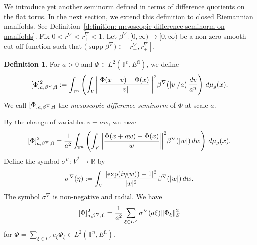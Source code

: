 \documentclass[a4paper,oneside,12pt]{amsart}
\theoremstyle{plain}
\theoremstyle{definition}
\newtheorem{definition}[theorem]{Definition}
\theoremstyle{remark}
\newcommand{\R}{\mathbb{R}}
\DeclarePairedDelimiter{\abs}{\lvert}{\rvert}
\DeclarePairedDelimiter{\norm}{\lVert}{\rVert}
\DeclarePairedDelimiter{\seminorm}{\lbrack}{\rbrack}
\DeclareMathOperator{\support}{supp}
\newcommand{\dvol}{d\mu}
\newcommand{\flattorus}{\mathbb{T}^n}
\newcommand{\Lattice}{L}
\newcommand{\duallattice}[1]{#1^{\vee}}
\newcommand{\flatmesoscopicdifferenceseminorm}[3][a]{\seminorm{#3}_{#1,#2,\mathrm{fl}}}
\newcommand{\cutoff}{\beta}
\newcommand{\cutoffnabla}{\cutoff^{\nabla}}
\newcommand{\symbolnabla}{\sigma^{\nabla}}
\newcommand{\flatmodel}[1]{#1^{\mathrm{fl}}}
\begin{document}
We introduce yet another seminorm defined in terms of difference quotients on the flat torus.
In the next section, we extend this definition to closed Riemannian manifolds.
See Definition~\ref{definition: mesoscopic difference seminorm on manifolds}.
Fix $0 < r_-^{\nabla} < r_+^{\nabla} < 1$.
Let $\cutoffnabla \colon [0,\infty) \to [0,\infty)$ be a non-zero smooth cut-off function such that $\big(\support \cutoffnabla\big) \subset [r_-^{\nabla},r_+^{\nabla}]$.
\begin{definition}\label{definition: flat mesoscopic difference seminorm}
  For $a > 0$ and $\Phi \in L^2(\flattorus,\flatmodel{E})$, we define
  \begin{equation}
    \flatmesoscopicdifferenceseminorm{\cutoffnabla}{\Phi}^2 := \int_{\flattorus} \left( \int_V \norm*{\frac{\Phi(x+v)-\Phi(x)}{\abs{v}}}^2 \cutoffnabla\big(\abs{v}/a\big) \,\frac{dv}{a^n} \right) \,\dvol_g(x).
  \end{equation}
  We call $\flatmesoscopicdifferenceseminorm{\cutoffnabla}{\Phi}$ the \emph{mesoscopic difference seminorm} of $\Phi$ at scale $a$.
\end{definition}

By the change of variables $v=aw$, we have
\begin{equation}
  \flatmesoscopicdifferenceseminorm{\cutoffnabla}{\Phi}^2 = \frac{1}{a^2} \int_{\flattorus} \left( \int_V \norm*{\frac{\Phi(x+aw)-\Phi(x)}{\abs{w}}}^2 \cutoffnabla(\abs{w}) \,dw \right) \,\dvol_g(x).
\end{equation}
Define the symbol $\symbolnabla \colon V^* \to \R$ by
\begin{equation}
  \symbolnabla(\eta) := \int_V \frac{\abs{\exp (i\eta(w)) - 1}^2}{\abs{w}^2} \cutoffnabla(\abs{w}) \,dw.
\end{equation}
The symbol $\symbolnabla$ is non-negative and radial.
We have
\begin{equation}\label{equation: Fourier transform of difference seminorm}
  \flatmesoscopicdifferenceseminorm{\cutoffnabla}{\Phi}^2 = \frac{1}{a^2} \sum_{\xi \in \duallattice{\Lattice}} \symbolnabla(a\xi) \norm{\Phi_{\xi}}_S^2
\end{equation}
for  $\Phi = \sum_{\xi \in \duallattice{\Lattice}} e_{\xi} \Phi_{\xi} \in L^2(\flattorus,\flatmodel{E})$.
\end{document}

